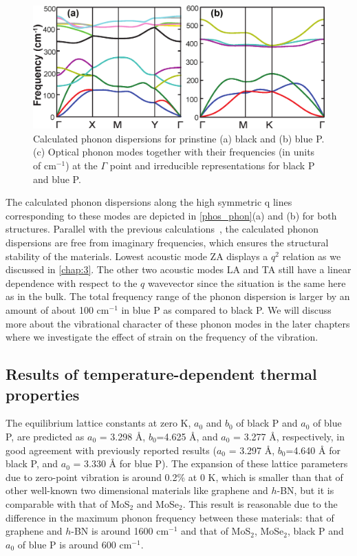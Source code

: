 \begin{figure}[htbp]
\centering
\includegraphics[width=0.8\linewidth]{phos_phon.eps}%
\caption{Calculated phonon dispersions for prinstine (a) black and (b) blue P. (c) Optical phonon modes together with their frequencies (in units of cm$^{-1}$) at the $\Gamma$ point and irreducible representations for black P and blue P.\label{phos_phon}}
\end{figure}

The calculated phonon dispersions along the high symmetric q lines corresponding to these modes are depicted in \autoref{phos_phon}(a) and (b) for both structures. Parallel with the previous calculations~\cite{phonon-blackP,phonon-blackP-1}, the calculated phonon dispersions are free from imaginary frequencies, which ensures the structural stability of the materials. Lowest acoustic mode ZA displays a $q^2$ relation as we discussed in \autoref{chap:3}.  The other two acoustic modes LA and TA still have a linear dependence with respect to the $q$ wavevector since the situation is the same here as in the bulk. The total frequency range of the phonon dispersion is larger by an amount of about 100 cm$^{-1}$ in blue P as compared to black P. We will discuss more about the vibrational character of these phonon modes in the later chapters where we investigate the effect of strain on the frequency of the vibration.

\subsection{Results of temperature-dependent thermal properties}

The equilibrium lattice constants at zero K, $a_0$ and $b_0$ of black P and $a_0$ of blue P, are predicted as $a_0$ = 3.298 {\AA}, $b_0$=4.625 {\AA}, and  $a_0$ = 3.277 {\AA}, respectively,  in  good agreement with previously reported results ($a_0$ = 3.297 {\AA}, $b_0$=4.640 {\AA} for black P\cite{fei,deniz3}, and  $a_0$ = 3.330 {\AA} for blue P\cite{Zhu2014}). 
The expansion of these lattice parameters due to zero-point vibration is around 0.2\% at 0 K, which is smaller than that of other well-known two dimensional materials like graphene and $h$-BN, but it is comparable with that of MoS$_2$ and MoSe$_2$. This result is reasonable due to the difference in the maximum phonon frequency between these materials: that of graphene and $h$-BN is around 1600 cm$^{-1}$ and that of MoS$_2$, MoSe$_2$, black P and $a_0$ of blue P is around 600 cm$^{-1}$. 

